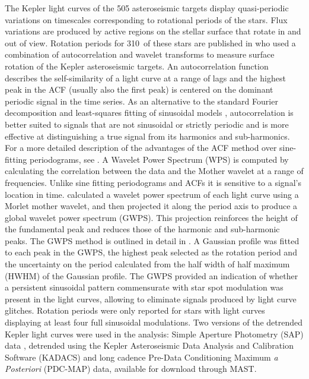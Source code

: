 \documentclass[10pt,preprint]{aastex}
\newcommand{\ngarcia}{310~}
\begin{document}
The Kepler light curves of the 505 asteroseismic targets display quasi-periodic variations on timescales corresponding to rotational periods of the stars.
Flux variations are produced by active regions on the stellar surface that rotate in and out of view.
Rotation periods for \ngarcia of these stars are published in \citet{Garcia2014} who used a combination of autocorrelation and wavelet transforms to measure surface rotation of the Kepler asteroseismic targets.
An autocorrelation function describes the self-similarity of a light curve at a range of lags and the highest peak in the ACF (usually also the first peak) is centered on the dominant periodic signal in the time series.
As an alternative to the standard Fourier decomposition and least-squares fitting of sinusoidal models \citep{Zechmeister}, autocorrelation is better suited to signals that are not sinusoidal or strictly periodic and is more effective at distinguishing a true signal from its harmonics and sub-harmonics.
For a more detailed description of the advantages of the ACF method over sine-fitting periodograms, see \citet{McQuillan}.
A Wavelet Power Spectrum (WPS) is computed by calculating the correlation between the data and the Mother wavelet at a range of frequencies.
Unlike sine fitting periodograms and ACFs it is sensitive to a signal's location in time.
\citet{Garcia2014} calculated a wavelet power spectrum of each light curve using a Morlet mother wavelet, and then projected it along the period axis to produce a global wavelet power spectrum (GWPS).
This projection reinforces the height of the fundamental peak and reduces those of the harmonic and sub-harmonic peaks.
The GWPS method is outlined in detail in \citep{Mathur2014}.
A Gaussian profile was fitted to each peak in the GWPS, the highest peak selected as the rotation period and the uncertainty on the period calculated from the half width of half maximum (HWHM) of the Gaussian profile.
The GWPS provided an indication of whether a persistent sinusoidal pattern commensurate with star spot modulation was present in the light curves, allowing \citet{Garcia2014} to eliminate signals produced by light curve glitches.
Rotation periods were only reported for stars with light curves displaying at least four full sinusoidal modulations.
Two versions of the detrended Kepler light curves were used in the analysis: Simple Aperture Photometry (SAP) data \citep{Thompson2013}, detrended using the Kepler Asteroseismic Data Analysis and Calibration Software (KADACS) \citep{Garcia2011} and long cadence Pre-Data Conditioning Maximum \emph{a Posteriori} (PDC-MAP) data, available for download through MAST.
\end{document}
